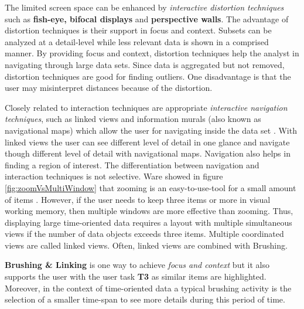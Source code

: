 The limited screen space can be enhanced by \textit{interactive distortion techniques} such as \textbf{fish-eye, bifocal displays} and \textbf{perspective walls}. The advantage of distortion techniques is their support in focus and context. Subsets can be analyzed at a detail-level while less relevant data is shown in a comprised manner. By providing focus and context, distortion techniques help the analyst in navigating through large data sets. Since data is aggregated but not removed, distortion techniques are good for finding outliers. One disadvantage is that the user may misinterpret distances because of the distortion.
\par

\label{navigation}
Closely related to interaction techniques are appropriate \textit{interactive navigation techniques},  such as linked views and information murals (also known as navigational maps) which allow the user for navigating inside the data set \cite{Jerding1998}. With linked views the user can see different level of detail in one glance and navigate though different level of detail with navigational maps. Navigation also helps in finding a region of interest.
The differentiation between navigation and interaction techniques is not selective.
\label{zoomingVsmultiple}
Ware  showed in figure \ref{fig:zoomVsMultiWindow} that zooming is an easy-to-use-tool for a small amount of items \cite{Ware2012}. However, if the user needs to keep three items or more in visual working memory, then multiple windows are more effective than zooming. Thus, displaying large time-oriented data requires a layout with multiple simultaneous views if the number of data objects exceeds three items. Multiple coordinated views are called linked views. Often, linked views are combined with Brushing. \par

\textbf{Brushing \& Linking }is one way to achieve \textit{focus and context} but it also supports the user with the user task \textbf{T3} as similar items are highlighted. Moreover, in the context of time-oriented data a typical brushing activity is the selection of a smaller time-span to see more details during this period of time. 
\par

